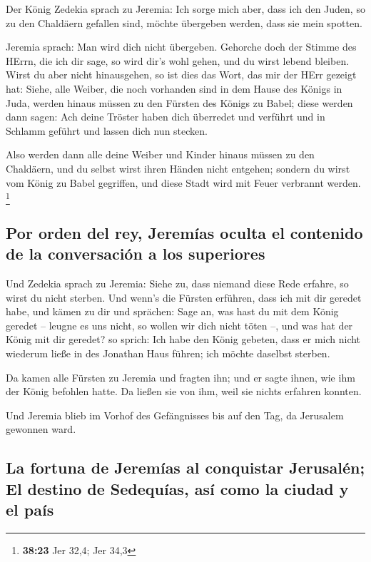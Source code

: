  Der König Zedekia sprach zu Jeremia: Ich sorge mich
aber, dass ich den Juden, so zu den Chaldäern gefallen sind, möchte
übergeben werden, dass sie mein spotten.

 Jeremia sprach: Man wird dich nicht übergeben. Gehorche
doch der Stimme des HErrn, die ich dir sage, so wird dir's wohl gehen,
und du wirst lebend bleiben.  Wirst du aber nicht
hinausgehen, so ist dies das Wort, das mir der HErr gezeigt hat:
 Siehe, alle Weiber, die noch vorhanden sind in dem Hause
des Königs in Juda, werden hinaus müssen zu den Fürsten des Königs zu
Babel; diese werden dann sagen: Ach deine Tröster haben dich überredet
und verführt und in Schlamm geführt und lassen dich nun stecken.

 Also werden dann alle deine Weiber und Kinder hinaus
müssen zu den Chaldäern, und du selbst wirst ihren Händen nicht
entgehen; sondern du wirst vom König zu Babel gegriffen, und diese Stadt
wird mit Feuer verbrannt werden. \footnote{\textbf{38:23} Jer 32,4; Jer
  34,3}

\hypertarget{por-orden-del-rey-jeremuxedas-oculta-el-contenido-de-la-conversaciuxf3n-a-los-superiores}{%
\subsection{Por orden del rey, Jeremías oculta el contenido de la
conversación a los
superiores}\label{por-orden-del-rey-jeremuxedas-oculta-el-contenido-de-la-conversaciuxf3n-a-los-superiores}}

 Und Zedekia sprach zu Jeremia: Siehe zu, dass niemand
diese Rede erfahre, so wirst du nicht sterben.  Und
wenn's die Fürsten erführen, dass ich mit dir geredet habe, und kämen zu
dir und sprächen: Sage an, was hast du mit dem König geredet -- leugne
es uns nicht, so wollen wir dich nicht töten --, und was hat der König
mit dir geredet?  so sprich: Ich habe den König gebeten,
dass er mich nicht wiederum ließe in des Jonathan Haus führen; ich
möchte daselbst sterben.

 Da kamen alle Fürsten zu Jeremia und fragten ihn; und er
sagte ihnen, wie ihm der König befohlen hatte. Da ließen sie von ihm,
weil sie nichts erfahren konnten.

 Und Jeremia blieb im Vorhof des Gefängnisses bis auf den
Tag, da Jerusalem gewonnen ward.

\hypertarget{la-fortuna-de-jeremuxedas-al-conquistar-jerusaluxe9n-el-destino-de-sedequuxedas-asuxed-como-la-ciudad-y-el-pauxeds}{%
\subsection{La fortuna de Jeremías al conquistar Jerusalén; El destino
de Sedequías, así como la ciudad y el
país}\label{la-fortuna-de-jeremuxedas-al-conquistar-jerusaluxe9n-el-destino-de-sedequuxedas-asuxed-como-la-ciudad-y-el-pauxeds}}

